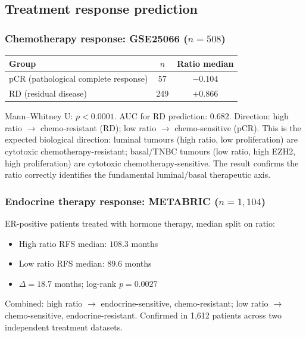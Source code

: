 \documentclass[12pt, a4paper]{article}
\begin{document}
\subsection{Treatment response prediction}

\subsubsection{Chemotherapy response: GSE25066 ($n=508$)}

\begin{center}
\begin{tabular}{lcc}
\toprule
\textbf{Group} & \textbf{$n$} & \textbf{Ratio median} \\
\midrule
pCR (pathological complete response) & 57  & $-0.104$ \\
RD  (residual disease)               & 249 & $+0.866$ \\
\bottomrule
\end{tabular}
\end{center}

\noindent Mann--Whitney U: $p < 0.0001$.
AUC for RD prediction: $0.682$.
Direction: high ratio $\rightarrow$ chemo-resistant (RD);
low ratio $\rightarrow$ chemo-sensitive (pCR). This is
the expected biological direction: luminal tumours (high
ratio, low proliferation) are cytotoxic chemotherapy-resistant;
basal/TNBC tumours (low ratio, high EZH2, high proliferation)
are cytotoxic chemotherapy-sensitive. The result confirms the
ratio correctly identifies the fundamental luminal/basal
therapeutic axis.

\subsubsection{Endocrine therapy response: METABRIC ($n=1{,}104$)}

ER-positive patients treated with hormone therapy, median
split on ratio:
\begin{itemize}[noitemsep]
  \item High ratio RFS median: $108.3$ months
  \item Low ratio RFS median: $89.6$ months
  \item $\Delta = 18.7$ months; log-rank $p = 0.0027$
\end{itemize}

Combined: high ratio $\rightarrow$ endocrine-sensitive,
chemo-resistant; low ratio $\rightarrow$ chemo-sensitive,
endocrine-resistant. Confirmed in 1,612 patients across
two independent treatment datasets.
\end{document}
